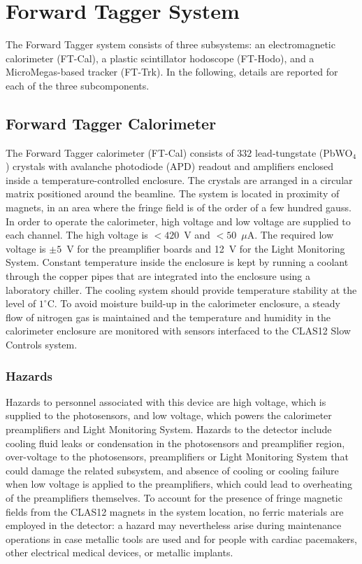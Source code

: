 \section{Forward Tagger System}

The Forward Tagger system consists of three subsystems: an electromagnetic calorimeter 
(FT-Cal), a plastic scintillator hodoscope (FT-Hodo), and a MicroMegas-based tracker 
(FT-Trk). In the following, details are reported for each of the three subcomponents.

\subsection{Forward Tagger Calorimeter}

The Forward Tagger calorimeter (FT-Cal) consists of $332$ lead-tungstate (PbWO$_4$) crystals 
with avalanche photodiode (APD) readout and amplifiers enclosed inside a temperature-controlled 
enclosure. The crystals are arranged in a circular matrix positioned around the beamline. The 
system is located in proximity of magnets, in an area where the fringe field is of the order of 
a few hundred gauss. In order to operate the calorimeter, high voltage and low voltage are 
supplied to each channel. The high voltage is $<420$~V and $<50$~$\mu$A. The required low voltage 
is $\pm 5$~V for the preamplifier boards and 12~V for the Light Monitoring System. Constant 
temperature inside the enclosure is kept by running a coolant through the copper pipes that 
are integrated into the enclosure using a laboratory chiller. The cooling system should provide 
temperature stability at the level of $1^\circ$C. To avoid moisture build-up in the calorimeter 
enclosure, a steady flow of nitrogen gas is maintained and the temperature and humidity in the 
calorimeter enclosure are monitored with sensors interfaced to the CLAS12 Slow Controls system.

\subsubsection{Hazards} 

Hazards to personnel associated with this device are high voltage, which is supplied to 
the photosensors, and low voltage, which powers the calorimeter preamplifiers and Light 
Monitoring System. Hazards to the detector include cooling fluid leaks or condensation in 
the photosensors and preamplifier region, over-voltage to the photosensors, preamplifiers 
or Light Monitoring System that could damage the related subsystem, and absence of cooling or 
cooling failure when low voltage is applied to the preamplifiers, which could lead to 
overheating of the preamplifiers themselves. To account for the presence of fringe magnetic 
fields from the CLAS12 magnets in the system location, no ferric materials are employed in 
the detector: a hazard may nevertheless arise during maintenance operations in case metallic 
tools are used and for people with cardiac pacemakers, other electrical medical devices, or 
metallic implants.

